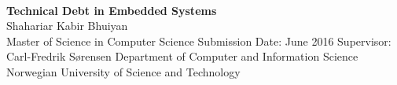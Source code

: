 
\thispagestyle{empty}
\mbox{}\\[6pc]

\begin{center}
\Huge{\textbf{Technical Debt in Embedded Systems}}\\[4pc]
\Large{Shahariar Kabir Bhuiyan}\\[1pc]


\noindent Master of Science in Computer Science
\linebreak
\noindent Submission Date: June 2016
\linebreak
\noindent Supervisor: Carl-Fredrik Sørensen
\linebreak
\linebreak
\noindent Department of Computer and Information Science\\
\noindent Norwegian University of Science and Technology
\end{center}

\vfill


